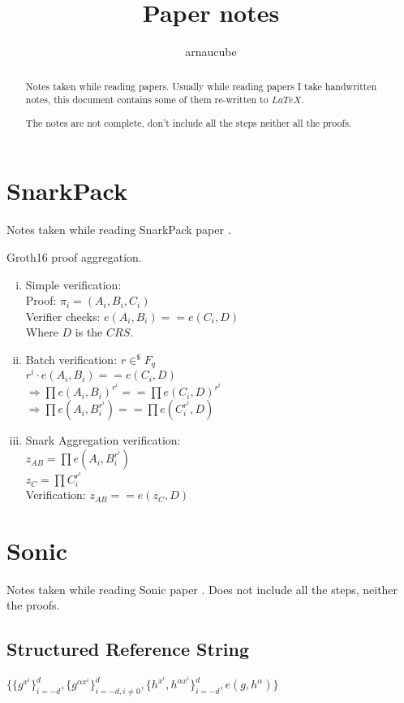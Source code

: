 \documentclass{article}
\title{Paper notes}
\author{arnaucube}
\date{}
\theoremstyle{definition}
\begin{document}
\maketitle

\begin{abstract}
	Notes taken while reading papers. Usually while reading papers I take handwritten notes, this document contains some of them re-written to $LaTeX$.

	The notes are not complete, don't include all the steps neither all the proofs.
\end{abstract}

\tableofcontents

\section{SnarkPack}
Notes taken while reading SnarkPack paper \cite{cryptoeprint:2021/529}.

Groth16 proof aggregation.

\begin{enumerate}[i.]
    \item Simple verification:\\
	Proof: $\pi_i = (A_i, B_i, C_i)$\\
	Verifier checks: $e(A_i, B_i) == e(C_i, D)$\\
	Where $D$ is the $CRS$.
    \item Batch verification:
	$r \in^\$ F_q$\\
	$r^i \cdot e(A_i, B_i) == e(C_i, D)$\\
	$\Longrightarrow \prod e(A_i, B_i)^{r^i} == \prod e(C_i, D)^{r^i}$\\
	$\Longrightarrow \prod e(A_i, B_i^{r^i}) == \prod e(C_i^{r^i}, D)$
    \item Snark Aggregation verification:\\
	$z_{AB} = \prod e(A_i, B_i^{r^i})$\\
	$z_C = \prod C_i^{r^i}$\\
	Verification: $z_{AB} == e(z_C, D)$
\end{enumerate}

\section{Sonic}
Notes taken while reading Sonic paper \cite{cryptoeprint:2019/099}. Does not include all the steps, neither the proofs.

\subsection{Structured Reference String}
$\{ \{g^{x^i}\}_{i=-d}^d, \{ g^{\alpha x^i} \}_{i=-d, i \neq 0}^d, \{ h^{x^i}, h^{\alpha x^i} \}_{i=-d}^d, e(g, h^\alpha) \}$
\end{document}

